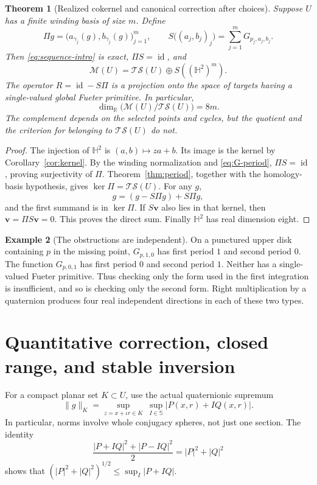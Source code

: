 \documentclass[11pt,a4paper]{article}
\numberwithin{equation}{section}
\newtheorem{theorem}{Theorem}[section]
\theoremstyle{definition}
\newtheorem{example}[theorem]{Example}
\theoremstyle{remark}
\newcommand{\R}{\mathbb R}
\newcommand{\HH}{\mathbb H}
\newcommand{\SSS}{\mathbb S}
\newcommand{\cS}{\mathscr S}
\newcommand{\cM}{\mathscr M}
\newcommand{\T}{\mathcal T}
\newcommand{\id}{\operatorname{id}}
\newcommand{\norm}[1]{\lVert#1\rVert}
\begin{document}
\begin{theorem}[Realized cokernel and canonical correction after choices]
\label{thm:splitting}
Suppose $U$ has a finite winding basis of size $m$. Define
\[
 \Pi g=\bigl(a_{\gamma_j}(g),b_{\gamma_j}(g)\bigr)_{j=1}^m,
 \qquad
 S\bigl((a_j,b_j)_j\bigr)=\sum_{j=1}^mG_{p_j,a_j,b_j}.
\]
Then \eqref{eq:sequence-intro} is exact, $\Pi S=\id$, and
\begin{equation}
 \cM(U)=\T\cS(U)\oplus S((\HH^2)^m).
 \label{eq:directsum}
\end{equation}
The operator $R=\id-S\Pi$ is a projection onto the space of targets having
a single-valued global Fueter primitive. In particular,
\[
 \dim_\R\bigl(\cM(U)/\T\cS(U)\bigr)=8m.
\]
The complement depends on the selected points and cycles, but the quotient
and the criterion for belonging to $\T\cS(U)$ do not.
\end{theorem}
\begin{proof}
The injection of $\HH^2$ is $(a,b)\mapsto za+b$. Its image is the
kernel by Corollary~\ref{cor:kernel}. By the winding normalization and
\eqref{eq:G-period}, $\Pi S=\id$, proving surjectivity of $\Pi$.
Theorem~\ref{thm:period}, together with the homology-basis hypothesis, gives
$\ker\Pi=\T\cS(U)$. For any $g$,
\[
 g=(g-S\Pi g)+S\Pi g,
\]
and the first summand is in $\ker\Pi$. If $S\mathbf v$ also lies in that
kernel, then $\mathbf v=\Pi S\mathbf v=0$. This proves the direct sum.
Finally $\HH^2$ has real dimension eight.
\end{proof}

\begin{example}[The obstructions are independent]
\label{ex:independent}
On a punctured upper disk containing $p$ in the missing point,
$G_{p,1,0}$ has first period $1$ and second period $0$.
The function $G_{p,0,1}$ has first period $0$ and second period $1$.
Neither has a single-valued Fueter primitive. Thus checking only the form
used in the first integration is insufficient, and so is checking only the
second form. Right multiplication by a quaternion produces four real
independent directions in each of these two types.
\end{example}

\section{Quantitative correction, closed range, and stable inversion}
\label{sec:stability}

For a compact planar set $K\subset U$, use the actual quaternionic supremum
\begin{equation}
 \norm{g}_K=\sup_{z=x+\iota r\in K}\ \sup_{I\in\SSS}|P(x,r)+IQ(x,r)|.
 \label{eq:normK}
\end{equation}
In particular, norms involve whole conjugacy spheres, not just one section.
The identity
\[
 \frac{|P+IQ|^2+|P-IQ|^2}{2}=|P|^2+|Q|^2
\]
shows that $(|P|^2+|Q|^2)^{1/2}\le\sup_I|P+IQ|$.
\end{document}
